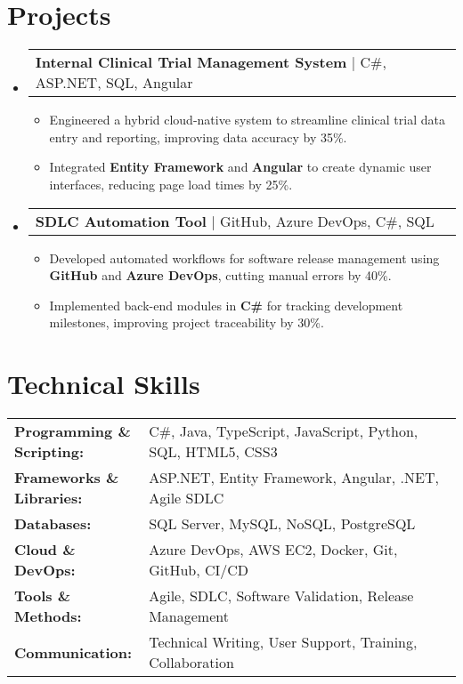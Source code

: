 \documentclass[letterpaper,11pt]{article}
\makeatletter
\newcommand{\resumeItem}[1]{
  \item\footnotesize{
    {#1 \vspace{-2pt}}
  }
}
\newcommand{\resumeProjectHeading}[2]{
    \item
    \begin{tabular*}{1.001\textwidth}{l@{\extracolsep{\fill}}r}
      \small#1 & \textbf{\small #2}\\
    \end{tabular*}\vspace{-7pt}
}
\newcommand{\resumeSubHeadingListStart}{\begin{itemize}[leftmargin=0pt, label={}]}
\newcommand{\resumeSubHeadingListEnd}{\end{itemize}}
\newcommand{\resumeItemListStart}{\begin{itemize}[leftmargin=*]}
\newcommand{\resumeItemListEnd}{\end{itemize}\vspace{-5pt}}
\makeatother
\begin{document}
\section{Projects}
    \vspace{-5pt}
    \resumeSubHeadingListStart
      \resumeProjectHeading
          {\textbf{Internal Clinical Trial Management System} | C\#, ASP.NET, SQL, Angular}{}
          \resumeItemListStart
              \resumeItem{Engineered a hybrid cloud-native system to streamline clinical trial data entry and reporting, improving data accuracy by 35\%.}
              \resumeItem{Integrated \textbf{Entity Framework} and \textbf{Angular} to create dynamic user interfaces, reducing page load times by 25\%.}
          \resumeItemListEnd
          \vspace{-16pt}
      \resumeProjectHeading
          {\textbf{SDLC Automation Tool} | GitHub, Azure DevOps, C\#, SQL}{}
          \resumeItemListStart
              \resumeItem{Developed automated workflows for software release management using \textbf{GitHub} and \textbf{Azure DevOps}, cutting manual errors by 40\%.}
              \resumeItem{Implemented back-end modules in \textbf{C\#} for tracking development milestones, improving project traceability by 30\%.}
          \resumeItemListEnd
          \vspace{-16pt}
    \resumeSubHeadingListEnd
\vspace{-10pt}
\section{Technical Skills}
        \vspace{-14pt}
        \begin{table}[h]
            \footnotesize
            \begin{tabular}{p{0.3\linewidth} p{0.7\linewidth}}
                \textbf{Programming \& Scripting:} & C\#, Java, TypeScript, JavaScript, Python, SQL, HTML5, CSS3 \\
                \textbf{Frameworks \& Libraries:} & ASP.NET, Entity Framework, Angular, .NET, Agile SDLC \\
                \textbf{Databases:} & SQL Server, MySQL, NoSQL, PostgreSQL \\
                \textbf{Cloud \& DevOps:} & Azure DevOps, AWS EC2, Docker, Git, GitHub, CI/CD \\
                \textbf{Tools \& Methods:} & Agile, SDLC, Software Validation, Release Management \\
                \textbf{Communication:} & Technical Writing, User Support, Training, Collaboration \\
            \end{tabular}
        \end{table}
\end{document}
